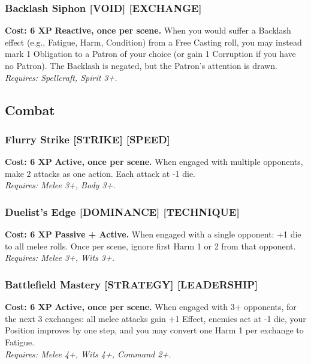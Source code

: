 \subsubsection*{Backlash Siphon \textnormal{[VOID] [EXCHANGE]}}
\label{talent:backlash-siphon}
\textbf{Cost: 6 XP} \textbf{Reactive, once per scene.} When you would suffer a Backlash effect (e.g., Fatigue, Harm, Condition) from a Free Casting roll, you may instead mark 1 Obligation to a Patron of your choice (or gain 1 Corruption if you have no Patron). The Backlash is negated, but the Patron's attention is drawn. \\
\textit{Requires: Spellcraft, Spirit 3+.}

\subsection*{Combat}
\label{sec:major-combat}

\subsubsection*{Flurry Strike \textnormal{[STRIKE] [SPEED]}}
\label{talent:flurry-strike}
\textbf{Cost: 6 XP} \textbf{Active, once per scene.} When engaged with multiple opponents, make 2 attacks as one action. Each attack at -1 die. \\
\textit{Requires: Melee 3+, Body 3+.}

\subsubsection*{Duelist's Edge \textnormal{[DOMINANCE] [TECHNIQUE]}}
\label{talent:duelists-edge}
\textbf{Cost: 6 XP} \textbf{Passive + Active.} When engaged with a single opponent: +1 die to all melee rolls. Once per scene, ignore first Harm 1 or 2 from that opponent. \\
\textit{Requires: Melee 3+, Wits 3+.}

\subsubsection*{Battlefield Mastery \textnormal{[STRATEGY] [LEADERSHIP]}}
\label{talent:battlefield-mastery}
\textbf{Cost: 6 XP} \textbf{Active, once per scene.} When engaged with 3+ opponents, for the next 3 exchanges: all melee attacks gain +1 Effect, enemies act at -1 die, your Position improves by one step, and you may convert one Harm 1 per exchange to Fatigue. \\
\textit{Requires: Melee 4+, Wits 4+, Command 2+.}

